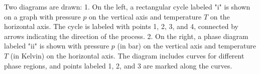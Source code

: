 Two diagrams are drawn:  
1. On the left, a rectangular cycle labeled "i" is shown on a graph with pressure \( p \) on the vertical axis and temperature \( T \) on the horizontal axis. The cycle is labeled with points 1, 2, 3, and 4, connected by arrows indicating the direction of the process.  
2. On the right, a phase diagram labeled "ii" is shown with pressure \( p \) (in bar) on the vertical axis and temperature \( T \) (in Kelvin) on the horizontal axis. The diagram includes curves for different phase regions, and points labeled 1, 2, and 3 are marked along the curves.
